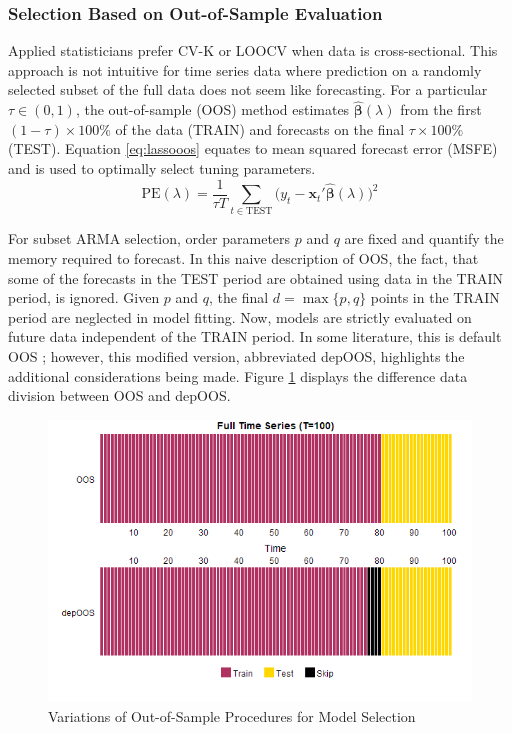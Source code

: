 \subsubsection{Selection Based on Out-of-Sample Evaluation}

Applied statisticians prefer CV-K or LOOCV when data is cross-sectional. This approach is not intuitive for time series data where prediction on a randomly selected subset of the full data does not seem like forecasting. For a particular $\tau\in (0,1)$, the out-of-sample (OOS) method estimates $\hat{\bm{\beta}}(\lambda)$ from the first $(1-\tau)\times 100\%$ of the data (TRAIN) and forecasts on the final $\tau\times 100\%$ (TEST). Equation 
\ref{eq:lassooos} equates to mean squared forecast error (MSFE) and is used to optimally select tuning parameters. 
\begin{equation}
\label{eq:lassooos}
	\widehat{\textrm{PE}}(\lambda)=\frac{1}{\tau T}\sum\limits_{t\in \textrm{TEST}} \bigg(y_t-\bm{x}_t'\hat{\bm{\beta}}(\lambda)\bigg)^2
\end{equation}

For subset ARMA selection, order parameters $p$ and $q$ are fixed and quantify the memory required to forecast.  In this naive description of OOS, the fact, that some of the forecasts in the TEST period are obtained using data in the TRAIN period, is ignored. Given $p$ and $q$, the final $d=\max\{p,q\}$ points in the TRAIN period are neglected in model fitting. Now, models are strictly evaluated on future data independent of the TRAIN period. In some literature, this is default OOS \citep{Bergmeir2018}; however, this modified version, abbreviated depOOS, highlights the additional considerations being made. Figure \ref{fig:oosplots} displays the difference data division between OOS and depOOS.

\begin{figure}[htbp!]
	\caption{Variations of Out-of-Sample Procedures for Model Selection}
	\center
	\label{fig:oosplots}
	\includegraphics[scale=0.58]{oosplots}
\end{figure}


